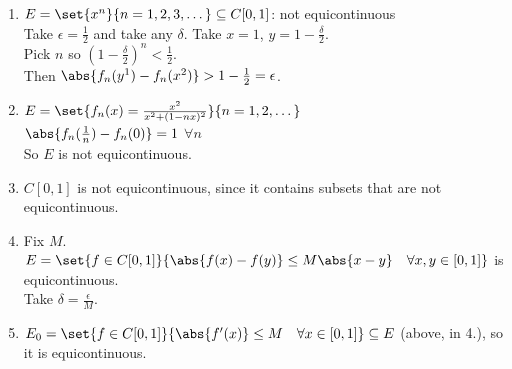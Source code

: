 \ex\begin{enumerate}
\item $E=\set{x^n}{n=1,2,3,\dotsc}\subseteq C[0,1]$: not equicontinuous \\
Take $\epsilon=\frac12$ and take any $\delta$.  Take $x=1$, $y=1-\frac\delta2$. \\
Pick $n$ so $(1-\frac\delta2)^n<\frac12$. \\
Then $\abs{f_n(y\footnotemark)-f_n(x\footnotemark)}>1-\frac12=\epsilon$.
\item $E=\set{f_n(x)=\frac{x^2}{x^2+(1-nx)^2}}{n=1,2,\dotsc}$ \\
$\abs{f_n(\frac1n)-f_n(0)}=1$ $\forall n$ \\
So $E$ is not equicontinuous.
\item $C[0,1]$ is not equicontinuous, since it contains subsets that are not equicontinuous.
\item Fix $M$.  $E=\set{f\in C[0,1]}{\abs{f(x)-f(y)}\leq M\abs{x-y}\quad\forall x,y\in[0,1]}$ is equicontinuous. \\
Take $\delta=\frac\epsilon M$.
\item $E_0=\set{f\in C[0,1]}{\abs{f'(x)}\leq M\quad\forall x\in[0,1]}\subseteq E$ (above, in 4.), so it is equicontinuous.
\end{enumerate}\addtocounter{footnote}{-1}\addtocounter{footnote}{1}
